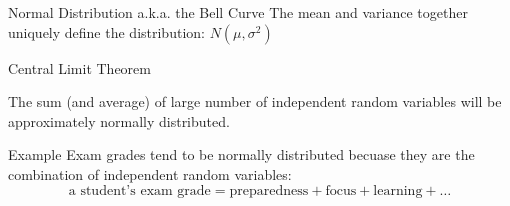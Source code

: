 \documentclass{beamer}\usepackage[]{graphicx}\usepackage[]{color}
\begin{document}
\begin{darkframes}
\begin{frame}[label=lists]{Normal Distribution a.k.a. the Bell Curve}
		The mean and variance together uniquely define the distribution: $N(\mu,\sigma^2)$		 \pause
		
		
		\begin{figure} 
			\centering
			\setlength\fboxsep{0pt}
			\setlength\fboxrule{0.5pt}
		\end{figure}
		
		
   			
	\end{frame}
	
	
	
	
	
	\begin{frame}[label=lists]{Central Limit Theorem}
		\begin{definition}
			The sum (and average) of large number of independent random variables will be approximately normally distributed.
		\end{definition}		 \pause
		
		\begin{exampleblock}{Example}
      Exam grades tend to be normally distributed becuase they are the combination of independent random variables:
			$$
				\text{a student's exam grade} = \text{preparedness} + \text{focus} + \text{learning} + \ldots 
			$$
		\end{exampleblock} \pause
		

   			
	\end{frame}	
	
	
	
	
	

\end{darkframes}
\end{document}
